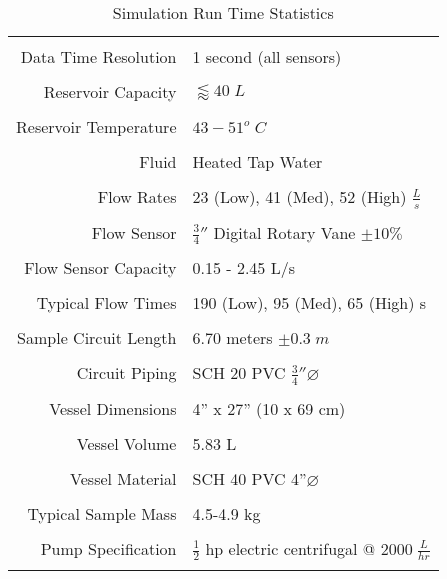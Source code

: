 \documentclass[a4paper,10pt]{scrbook}
\begin{document}
\begin{table}[t!]
\caption{Simulation Run Time Statistics}
\label{runTime}
\centering
\begin{tabular}{r l}
\hline
\hline
\\[-.5ex]
Data Time Resolution    & 1 second (all sensors)\\
\\
Reservoir Capacity	& $\lessapprox 40\;L$\\
\\
Reservoir Temperature 	& $43-51^{o}\;C$\\
\\
Fluid 			& Heated Tap Water\\
\\
Flow Rates		& 23 (Low), 41 (Med), 52 (High) $\frac{L}{s}$\\
\\
Flow Sensor		& $\frac{3}{4}''$ Digital Rotary Vane $\pm10\%$\\
\\
Flow Sensor Capacity	& 0.15 - 2.45 L/s\\
\\
Typical Flow Times	& 190 (Low), 95 (Med), 65 (High) s\\
\\
Sample Circuit Length	& 6.70 meters $\pm0.3\;m$\\
\\
Circuit Piping		& SCH 20 PVC $\frac{3}{4}''\varnothing$\\
\\
Vessel Dimensions	& 4'' x 27'' (10 x 69 cm)\\
\\
Vessel Volume		& 5.83 L\\
\\
Vessel Material		& SCH 40 PVC 4''$\varnothing$\\
\\
Typical Sample Mass	& 4.5-4.9 kg\\
\\
Pump Specification	& $\frac{1}{2}$ hp electric centrifugal @ $2000\;\frac{L}{hr}$\\
\\
\hline
\end{tabular}
\end{table} 
\end{document}

